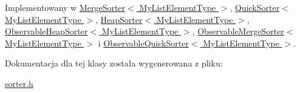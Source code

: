 Implementowany w \hyperlink{class_merge_sorter_aaee4333eb37af6401eca60da3398e507}{Merge\-Sorter$<$ My\-List\-Element\-Type $>$}, \hyperlink{class_quick_sorter_ae2b74900a972d05c06df3c9a06123c00}{Quick\-Sorter$<$ My\-List\-Element\-Type $>$}, \hyperlink{class_heap_sorter_a31220ba55d4478c50578c3a94dcbf26c}{Heap\-Sorter$<$ My\-List\-Element\-Type $>$}, \hyperlink{class_observable_heap_sorter_a5e92d70e5a769ba7249f974a48b94bd0}{Observable\-Heap\-Sorter$<$ My\-List\-Element\-Type $>$}, \hyperlink{class_observable_merge_sorter_ac845eed6758733f3935ffb5aa0b5f64a}{Observable\-Merge\-Sorter$<$ My\-List\-Element\-Type $>$} i \hyperlink{class_observable_quick_sorter_aa32fd1f6c024b3993c4d43302d0702f3}{Observable\-Quick\-Sorter$<$ My\-List\-Element\-Type $>$}.



Dokumentacja dla tej klasy została wygenerowana z pliku\-:\begin{DoxyCompactItemize}
\item 
\hyperlink{sorter_8h}{sorter.\-h}\end{DoxyCompactItemize}
